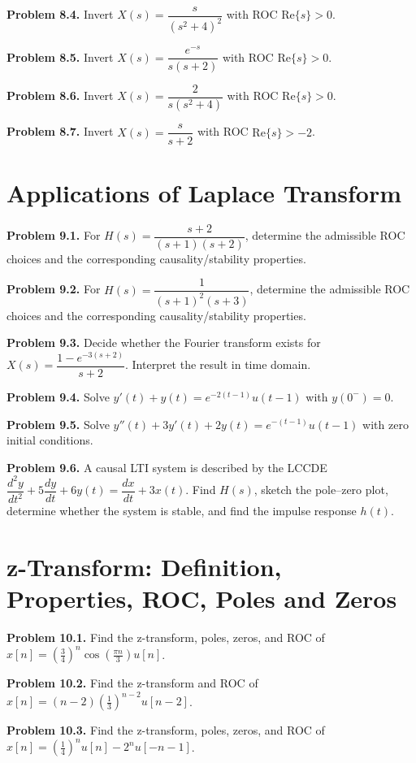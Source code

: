 \documentclass[10pt]{article}
\newcommand{\QuestionItem}[2]{\par\medskip\textbf{#1.} #2\par}
\begin{document}
\QuestionItem{Problem 8.4}{Invert \(X(s)=\dfrac{s}{(s^2+4)^2}\) with ROC \(\text{Re}\{s\}>0\).}

\QuestionItem{Problem 8.5}{Invert \(X(s)=\dfrac{e^{-s}}{s(s+2)}\) with ROC \(\text{Re}\{s\}>0\).}

\QuestionItem{Problem 8.6}{Invert \(X(s)=\dfrac{2}{s(s^2+4)}\) with ROC \(\text{Re}\{s\}>0\).}

\QuestionItem{Problem 8.7}{Invert \(X(s)=\dfrac{s}{s+2}\) with ROC \(\text{Re}\{s\}>-2\).}

\section{Applications of Laplace Transform}

\QuestionItem{Problem 9.1}{For \(H(s)=\dfrac{s+2}{(s+1)(s+2)}\), determine the admissible ROC choices and the corresponding causality/stability properties.}

\QuestionItem{Problem 9.2}{For \(H(s)=\dfrac{1}{(s+1)^2(s+3)}\), determine the admissible ROC choices and the corresponding causality/stability properties.}

\QuestionItem{Problem 9.3}{Decide whether the Fourier transform exists for \(X(s)=\dfrac{1-e^{-3(s+2)}}{s+2}\). Interpret the result in time domain.}

\QuestionItem{Problem 9.4}{Solve \(y'(t)+y(t)=e^{-2(t-1)}u(t-1)\) with \(y(0^-)=0\).}

\QuestionItem{Problem 9.5}{Solve \(y''(t)+3y'(t)+2y(t)=e^{-(t-1)}u(t-1)\) with zero initial conditions.}

\QuestionItem{Problem 9.6}{A causal LTI system is described by the LCCDE \(\dfrac{d^2 y}{dt^2}+5\dfrac{dy}{dt}+6y(t)=\dfrac{dx}{dt}+3x(t)\). Find \(H(s)\), sketch the pole--zero plot, determine whether the system is stable, and find the impulse response \(h(t)\).}

\section{z-Transform: Definition, Properties, ROC, Poles and Zeros}

\QuestionItem{Problem 10.1}{Find the z-transform, poles, zeros, and ROC of \(x[n]=\left(\frac34\right)^n\cos\!\left(\frac{\pi n}{3}\right)u[n]\).}

\QuestionItem{Problem 10.2}{Find the z-transform and ROC of \(x[n]=(n-2)\left(\frac13\right)^{n-2}u[n-2]\).}

\QuestionItem{Problem 10.3}{Find the z-transform, poles, zeros, and ROC of \(x[n]=\left(\frac14\right)^n u[n]-2^n u[-n-1]\).}
\end{document}
